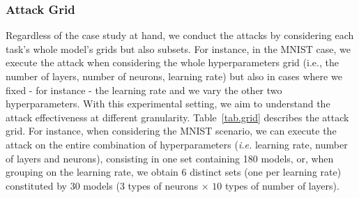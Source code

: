\subsubsection{Attack Grid}
\label{ssec.grid}
Regardless of the case study at hand, we conduct the attacks by considering each task's whole model's grids but also subsets. 
For instance, in the MNIST case, we execute the attack when considering the whole hyperparameters grid (i.e., the number of layers, number of neurons, learning rate) but also in cases where we fixed - for instance - the learning rate and we vary the other two hyperparameters. 
With this experimental setting, we aim to understand the attack effectiveness at different granularity.
Table~\ref{tab.grid} describes the attack grid. 
For instance, when considering the MNIST scenario, we can execute the attack on the entire combination of hyperparameters (\textit{i.e.} learning rate, number of layers and neurons), consisting in one set containing 180 models, or, when grouping on the learning rate, we obtain 6 distinct sets (one per learning rate) constituted by 30 models ($3$ types of neurons $\times$ $10$ types of number of layers). 


